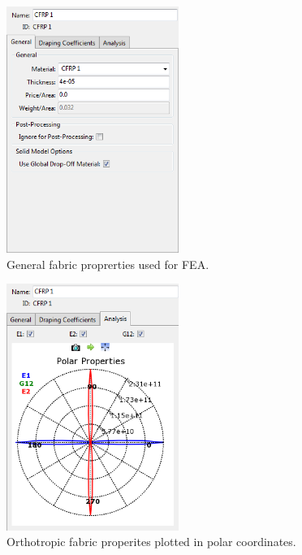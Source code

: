 \begin{figure}[htp]
\centering
\includegraphics[width=0.5\textwidth]{./figures/fea/fea-acp-fabric-prorties-general}
\caption{General fabric proprerties used for FEA.}
\label{fig:fea-acp-fabric-prorties-general}
\end{figure}

\begin{figure}[htp]
\centering
\includegraphics[width=0.5\textwidth]{./figures/fea/fea-acp-fabric-properties-polar}
\caption{Orthotropic fabric properites plotted in polar coordinates.}
\label{fig:fea-acp-fabric-properties-polar}
\end{figure}


